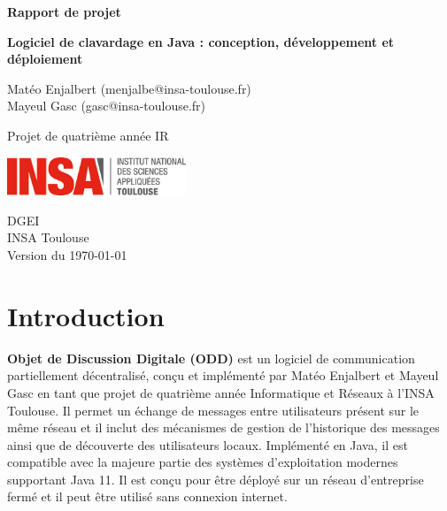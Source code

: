 \documentclass[12pt, a4paper]{article}
\begin{document}
    \begin{titlepage}
        \begin{center}
            \vspace*{1cm}
            
            \textbf{\large Rapport de projet}
            
            \vspace{0.5cm}
            
            \textbf{Logiciel de clavardage en Java : conception, développement et déploiement}
    
            \vspace{0.5cm}
    
            Matéo Enjalbert (menjalbe@insa-toulouse.fr) \\ 
            Mayeul Gasc (gasc@insa-toulouse.fr)
    
            \vfill
                
            Projet de quatrième année IR
                
            \vspace{0.8cm}
            
            \includegraphics[width=0.4\textwidth]{logo-insa.jpg}
            
            \vspace{0.8cm}
            
            DGEI\\
            INSA Toulouse\\
            Version du \today
                
       \end{center}
    \end{titlepage}
    
    \newpage
    
    \tableofcontents
    \setcounter{page}{1}
    
    \newpage
    
    \section*{Introduction}
    \label{sec:intro}
    
    
    \textbf{Objet de Discussion Digitale (ODD)} est un logiciel de communication partiellement décentralisé, conçu et implémenté par Matéo Enjalbert et Mayeul Gasc en tant que projet de quatrième année Informatique et Réseaux à l'INSA Toulouse. Il permet un échange de messages entre utilisateurs présent sur le même réseau et il inclut des mécanismes de gestion de l'historique des messages ainsi que de découverte des utilisateurs locaux. Implémenté en Java, il est compatible avec la majeure partie des systèmes d'exploitation modernes supportant Java 11. Il est conçu pour être déployé sur un réseau d'entreprise fermé et il peut être utilisé sans connexion internet.\\
    
\end{document}
